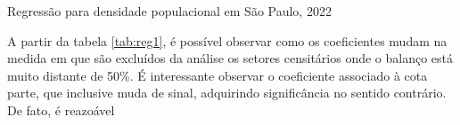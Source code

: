 \begin{table}[h]
    \caption{Regressão para densidade populacional em São Paulo, 2022}
    
    \label{tab:reg1}
\end{table}

A partir da tabela \ref{tab:reg1}, é possível observar como os coeficientes mudam na medida em que são excluídos da análise os setores censitários onde o balanço está muito distante de 50\%. É interessante observar o coeficiente associado à cota parte, que inclusive muda de sinal, adquirindo significância no sentido contrário. De fato, é reazoável






